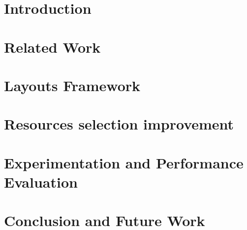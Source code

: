 \documentclass[conference]{IEEEtran}
\begin{document}
\section{Introduction}



\section{Related Work}
\label{sec:related_work}


\section{Layouts Framework}


\section{Resources selection improvement}

\section{Experimentation and Performance Evaluation}

\label{sec:future}



\section{Conclusion and Future Work}














\end{document}
